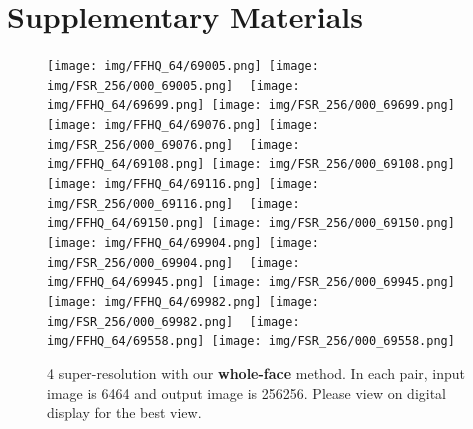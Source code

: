 \documentclass[10pt,twocolumn,letterpaper]{article}
\begin{document}
\newpage
\clearpage
\appendix
\section{Supplementary Materials}

\begin{figure*}[b!]
\begin{center}
\texttt{[image: img/FFHQ\_64/69005.png]}~\texttt{[image: img/FSR\_256/000\_69005.png]}
~
\texttt{[image: img/FFHQ\_64/69699.png]}~\texttt{[image: img/FSR\_256/000\_69699.png]}
~
\texttt{[image: img/FFHQ\_64/69076.png]}~\texttt{[image: img/FSR\_256/000\_69076.png]}
~
\texttt{[image: img/FFHQ\_64/69108.png]}~\texttt{[image: img/FSR\_256/000\_69108.png]}
~
\texttt{[image: img/FFHQ\_64/69116.png]}~\texttt{[image: img/FSR\_256/000\_69116.png]}
~
\texttt{[image: img/FFHQ\_64/69150.png]}~\texttt{[image: img/FSR\_256/000\_69150.png]}
~
\texttt{[image: img/FFHQ\_64/69904.png]}~\texttt{[image: img/FSR\_256/000\_69904.png]}
~
\texttt{[image: img/FFHQ\_64/69945.png]}~\texttt{[image: img/FSR\_256/000\_69945.png]}
~
\texttt{[image: img/FFHQ\_64/69982.png]}~\texttt{[image: img/FSR\_256/000\_69982.png]}
~
\texttt{[image: img/FFHQ\_64/69558.png]}~\texttt{[image: img/FSR\_256/000\_69558.png]}
\end{center}
\caption{4 super-resolution with our \textbf{whole-face} method. In each pair, input image is 6464 and output image is 256256. Please view on digital display for the best view.}
\label{fig:comparison_256_appendix}
\end{figure*}
 
\end{document}
